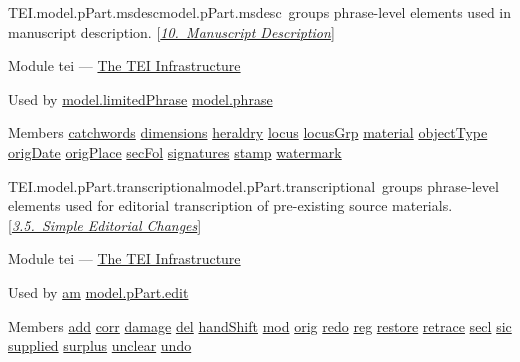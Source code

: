 \begin{reflist}
\item[]\begin{specHead}{TEI.model.pPart.msdesc}{model.pPart.msdesc} groups phrase-level elements used in manuscript description. [\textit{\hyperref[MS]{10.\ Manuscript Description}}]\end{specHead} 
    \item[{Module}]
  tei — \hyperref[ST]{The TEI Infrastructure}
    \item[{Used by}]
  \hyperref[TEI.model.limitedPhrase]{model.limitedPhrase} \hyperref[TEI.model.phrase]{model.phrase}
    \item[{Members}]
  \hyperref[TEI.catchwords]{catchwords} \hyperref[TEI.dimensions]{dimensions} \hyperref[TEI.heraldry]{heraldry} \hyperref[TEI.locus]{locus} \hyperref[TEI.locusGrp]{locusGrp} \hyperref[TEI.material]{material} \hyperref[TEI.objectType]{objectType} \hyperref[TEI.origDate]{origDate} \hyperref[TEI.origPlace]{origPlace} \hyperref[TEI.secFol]{secFol} \hyperref[TEI.signatures]{signatures} \hyperref[TEI.stamp]{stamp} \hyperref[TEI.watermark]{watermark}
\end{reflist}  
\begin{reflist}
\item[]\begin{specHead}{TEI.model.pPart.transcriptional}{model.pPart.transcriptional} groups phrase-level elements used for editorial transcription of pre-existing source materials. [\textit{\hyperref[COED]{3.5.\ Simple Editorial Changes}}]\end{specHead} 
    \item[{Module}]
  tei — \hyperref[ST]{The TEI Infrastructure}
    \item[{Used by}]
  \hyperref[TEI.am]{am} \hyperref[TEI.model.pPart.edit]{model.pPart.edit}
    \item[{Members}]
  \hyperref[TEI.add]{add} \hyperref[TEI.corr]{corr} \hyperref[TEI.damage]{damage} \hyperref[TEI.del]{del} \hyperref[TEI.handShift]{handShift} \hyperref[TEI.mod]{mod} \hyperref[TEI.orig]{orig} \hyperref[TEI.redo]{redo} \hyperref[TEI.reg]{reg} \hyperref[TEI.restore]{restore} \hyperref[TEI.retrace]{retrace} \hyperref[TEI.secl]{secl} \hyperref[TEI.sic]{sic} \hyperref[TEI.supplied]{supplied} \hyperref[TEI.surplus]{surplus} \hyperref[TEI.unclear]{unclear} \hyperref[TEI.undo]{undo}
\end{reflist}  

